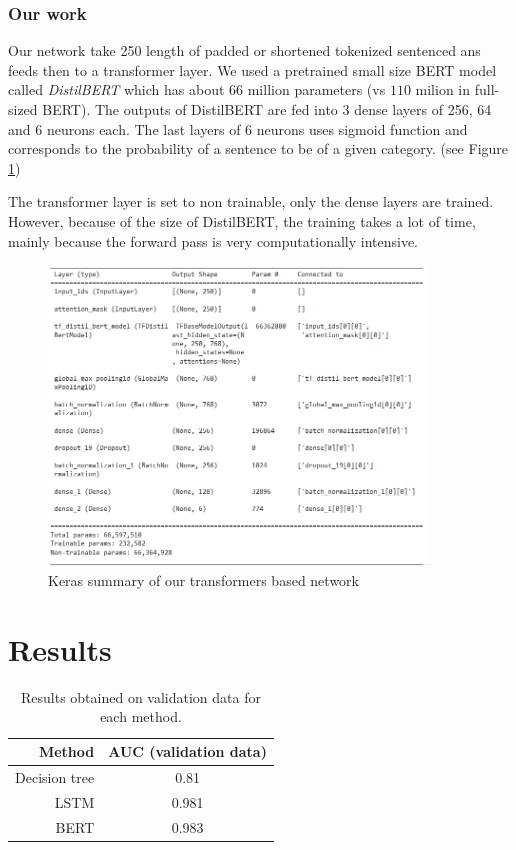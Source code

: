 \documentclass[11pt]{scrartcl}
\begin{document}
\subsubsection{Our work}

Our network take 250 length of padded or shortened tokenized sentenced ans feeds then to a transformer layer. We used a pretrained small size BERT model called \textit{DistilBERT} which has about $66$ million parameters (vs $110$ milion in full-sized BERT). The outputs of DistilBERT are fed into 3 dense layers of 256, 64 and 6 neurons each. The last layers of 6 neurons uses sigmoid function and corresponds to the probability of a sentence to be of a given category. (see Figure \ref{fig:sumtrans})

The transformer layer is set to non trainable, only the dense layers are trained. However, because of the size of DistilBERT, the training takes a lot of time, mainly because the forward pass is very computationally intensive.

\begin{figure}[]
    \centering
    \includegraphics[width=0.9\textwidth]{img/summary transformer.PNG}
    \caption{Keras summary of our transformers based network}
    \label{fig:sumtrans}
\end{figure}

\section{Results}


\begin{table}[H]
\begin{center}
\begin{tabular}{| r | c |}
\hline
Method & AUC (validation data) \\ \hline \hline
Decision tree & 0.81 \\ \hline
LSTM & 0.981 \\ \hline
BERT & 0.983 \\ \hline
\end{tabular}
\end{center}
\caption{\label{tab:result-table}Results obtained on validation data for each method.}
\end{table}
\end{document}
